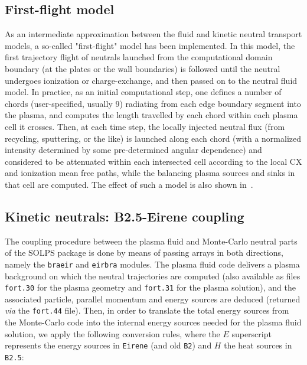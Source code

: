 \documentclass[a4paper,10pt]{report}
\begin{document}
\subsection{First-flight model}

As an intermediate approximation between the fluid and kinetic neutral transport models,
a so-called "first-flight" model has been implemented. In this model, the first trajectory
flight of neutrals launched from the computational domain boundary (at the plates or the wall
boundaries) is followed until the neutral undergoes ionization or charge-exchange, and then
passed on to the neutral fluid model. In practice, as an initial computational step,
one defines a number of chords (user-specified, usually 9)
radiating from each edge boundary segment into the plasma, and computes the length travelled by
each chord within each plasma cell it crosses. Then, at each time step, the locally injected neutral flux
(from recycling, sputtering, or the like) is launched along each chord (with a normalized intensity
determined by some pre-determined angular dependence)
and considered to be attenuated within each intersected cell according to the local CX and ionization mean free paths,
while the balancing plasma sources and sinks in that cell are computed.
The effect of such a model is also shown in~\cite{CosterHinM2003}.

\subsection{Kinetic neutrals: B2.5-Eirene coupling}
\label{sec:sourcescoupling}

The coupling procedure between the plasma fluid and Monte-Carlo
neutral parts of the SOLPS package is done by means of passing arrays in
both directions, namely the {\tt braeir} and {\tt eirbra} modules.
The plasma fluid code delivers a plasma background on which
the neutral trajectories are computed (also available as files {\tt fort.30} for
the plasma geometry and {\tt fort.31} for the plasma solution), and the associated particle, parallel momentum
and energy sources are deduced (returned {\it via} the {\tt fort.44} file). Then, in order to translate the total energy
sources from the Monte-Carlo code into the internal energy sources needed for
the plasma fluid solution, we apply the following conversion rules, where the $E$ superscript
represents the energy sources in {\tt Eirene} (and old {\tt B2}) and $H$ the heat sources in {\tt B2.5}:
\end{document}

